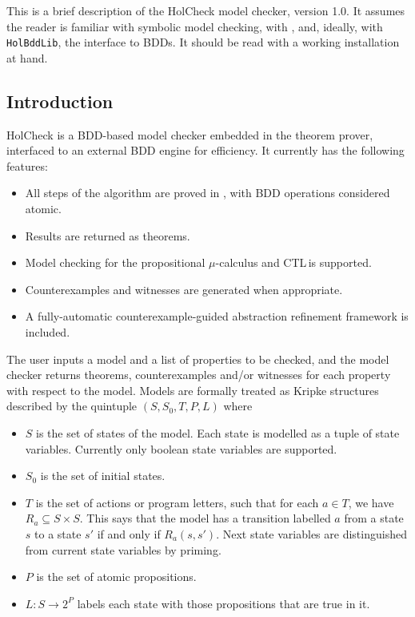 \newcommand{\tsu}[1]{\textsf{\textup{#1}}}
\newcommand{\semb}[1]{\ensuremath{[\![#1]\!]}}
\newcommand{\rvset}{\ensuremath{V\!\!AR}}
\newcommand{\wff}{\ensuremath{w\!f\!\!f}}
\newcommand{\nnf}{\ensuremath{N\!N\!F\,}}
\newcommand{\ctl}{\textsf{CTL}\,}
\newcommand{\hc}{HolCheck}
\newcommand{\hand}{\texttt{/\char'134}}
\newcommand{\hor}{\texttt{\char'134/}}
\newcommand{\hnot}{\texttt{\~{}}}
\setcounter{sessioncount}{0}

This is a brief description of the \hc{} model checker, version 1.0. It assumes the reader is familiar with symbolic model checking, with \HOL{}, and, ideally, with \texttt{HolBddLib}, the \HOL{} interface to BDDs. It should be read with a working \HOL{} installation at hand.

\subsection{Introduction}\label{sec:intro}

\hc{} is a BDD-based model checker embedded in the \HOL{} theorem prover, interfaced to an external BDD engine for efficiency. It currently has the following features:

\begin{itemize}
\item All steps of the algorithm are proved in \HOL{}, with BDD operations considered atomic.
\item Results are returned as \HOL{} theorems.
\item Model checking for the propositional \(\mu\)-calculus and \ctl is supported.
\item Counterexamples and witnesses are generated when appropriate.
\item A fully-automatic counterexample-guided abstraction refinement framework is included.
\end{itemize}

The user inputs a model and a list of properties to be checked, and the model checker returns theorems, counterexamples and/or witnesses for each property with respect to the model. Models are formally treated as Kripke structures described by the quintuple \( (S, S_0, T, P, L) \) where

\begin{itemize}
\item \( S \) is the set of states of the model. Each state is modelled as a tuple of state variables. Currently only boolean state variables are supported.
\item \( S_0\) is the set of initial states.
\item \( T \) is the set of actions or program letters, such that for each \( a \in T \), we have \( R_a \subseteq S \times S\). This says that the model has a transition labelled \( a \) from a state \( s \) to a state \( s' \) if and only if \( R_a(s,s') \). Next state variables are distinguished from current state variables by priming.
\item \( P \) is the set of atomic propositions.
\item \( L:S\rightarrow 2^P \) labels each state with those propositions that are true in it.
\end{itemize}

